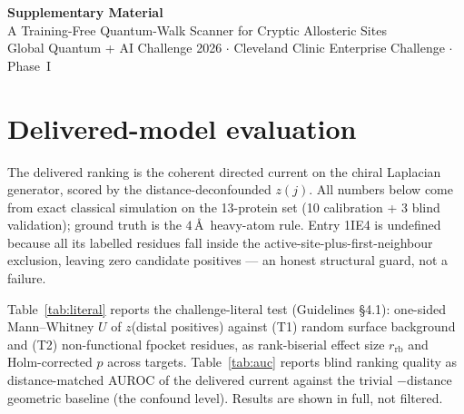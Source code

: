 \documentclass[10pt,a4paper]{article}
\begin{document}
\begin{center}
  {\large\bfseries Supplementary Material}\\[3pt]
  {\small A Training-Free Quantum-Walk Scanner for Cryptic Allosteric Sites\\
   Global Quantum + AI Challenge 2026 $\cdot$ Cleveland Clinic Enterprise Challenge $\cdot$ Phase~I}
\end{center}
\vspace{0.4em}

\section{Delivered-model evaluation}

The delivered ranking is the coherent directed current on the chiral Laplacian generator, scored by the
distance-deconfounded $z(j)$. All numbers below come from exact classical simulation on the
13-protein set (10 calibration + 3 blind validation); ground truth is the $4$\,\AA\ heavy-atom rule.
Entry 1IE4 is undefined because all its labelled residues fall inside the active-site-plus-first-neighbour
exclusion, leaving zero candidate positives --- an honest structural guard, not a failure.

Table~\ref{tab:literal} reports the challenge-literal test (Guidelines \S4.1): one-sided Mann--Whitney
$U$ of $z$(distal positives) against (T1) random surface background and (T2) non-functional fpocket
residues, as rank-biserial effect size $r_{\mathrm{rb}}$ and Holm-corrected $p$ across targets.
Table~\ref{tab:auc} reports blind ranking quality as distance-matched AUROC of the delivered current
against the trivial $-$distance geometric baseline (the confound level). Results are shown in full,
not filtered.
\end{document}
